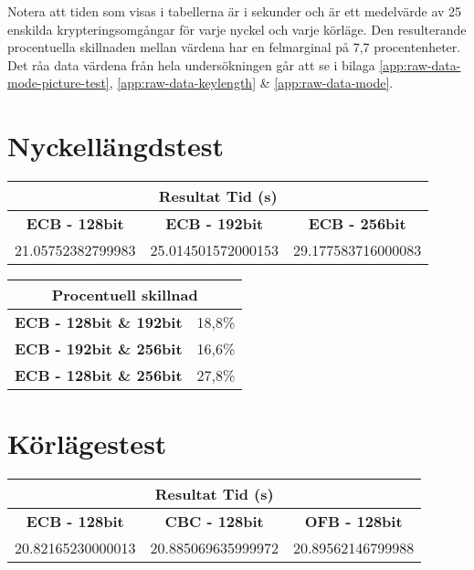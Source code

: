 \label{chap:resultat}
Notera att tiden som visas i tabellerna är i sekunder och är ett medelvärde av 25 enskilda
krypteringsomgångar för varje nyckel och varje körläge.
Den resulterande procentuella skillnaden mellan värdena har en felmarginal på 7,7 procentenheter. %
Det råa data värdena från hela undersökningen
går att se i bilaga \ref{app:raw-data-mode-picture-test}, \ref{app:raw-data-keylength} \& \ref{app:raw-data-mode}.

\section{Nyckellängdstest}
\label{sec:nyckellangd}

\begin{table}[H]
    \centering
    \begin{tabular}{ |c|c|c| }
      \multicolumn{3}{c}{\bfseries{Resultat Tid (s)}} \\
      \hline
      \bfseries{ECB - 128bit} & \bfseries{ECB - 192bit} & \bfseries{ECB - 256bit} \\
      \hline
      21.05752382799983 & 25.014501572000153 & 29.177583716000083 \\
      \hline
    \end{tabular}
\end{table}

\begin{table}[H]
  \centering
  \begin{tabular}{ |c|c| }
    \multicolumn{2}{c}{\bfseries{Procentuell skillnad}} \\
    \hline
    \bfseries{ECB - 128bit \& 192bit} & 18,8\% \\
    \hline
    \bfseries{ECB - 192bit \& 256bit} & 16,6\% \\
    \hline
    \bfseries{ECB - 128bit \& 256bit} & 27,8\% \\
    \hline
  \end{tabular}
\end{table}

\section{Körlägestest}
\label{sec:korlages}

\begin{table}[H]
    \centering
    \begin{tabular}{ |c|c|c| }
      \multicolumn{3}{c}{\bfseries{Resultat Tid (s)}} \\
      \hline
      \bfseries{ECB - 128bit} & \bfseries{CBC - 128bit} & \bfseries{OFB - 128bit} \\
      \hline
      20.82165230000013 & 20.885069635999972 & 20.89562146799988 \\
      \hline
    \end{tabular}
\end{table}

